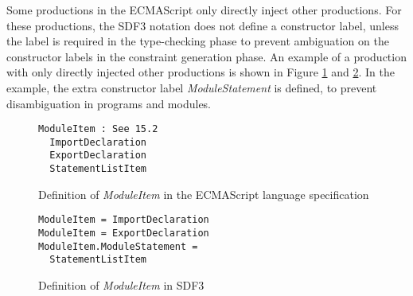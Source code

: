 Some productions in the ECMAScript only directly inject other productions.
For these productions, the SDF3 notation does not define a constructor label, unless the label is required in the type-checking phase to prevent ambiguation on the constructor labels in the constraint generation phase.
An example of a production with only directly injected other productions is shown in Figure \ref{fig:direct-production-spec} and \ref{fig:direct-production-sdf}.
In the example, the extra constructor label \textit{ModuleStatement} is defined, to prevent disambiguation in programs and modules.

\begin{figure}[H]
\begin{lstlisting}
ModuleItem : See 15.2
  ImportDeclaration
  ExportDeclaration
  StatementListItem
\end{lstlisting}
\caption{Definition of \textit{ModuleItem} in the ECMAScript language specification}
\label{fig:direct-production-spec}
\end{figure}

\begin{figure}[H]
\begin{lstlisting}
ModuleItem = ImportDeclaration
ModuleItem = ExportDeclaration
ModuleItem.ModuleStatement = 
  StatementListItem
\end{lstlisting}
\caption{Definition of \textit{ModuleItem} in SDF3}
\label{fig:direct-production-sdf}
\end{figure}



